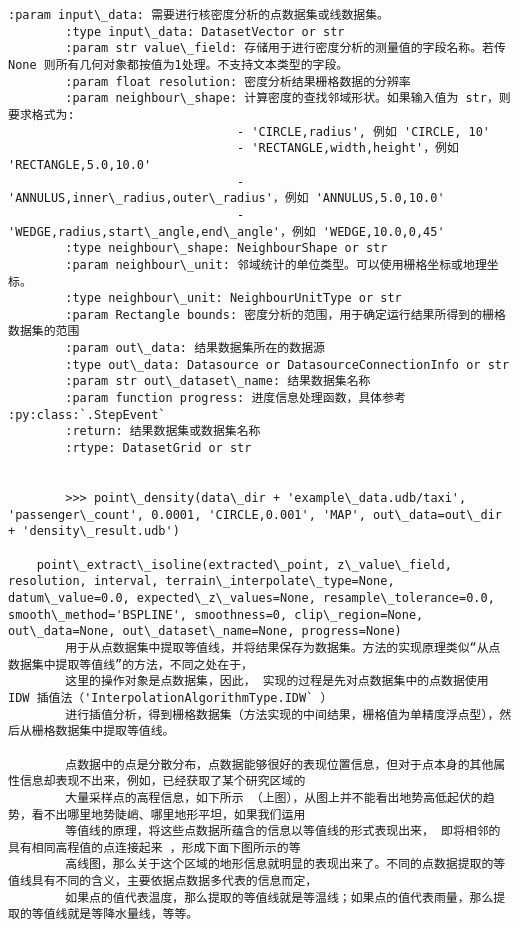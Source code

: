 \documentclass[11pt]{article}
\begin{document}
\begin{Verbatim}[commandchars=\\\{\}]
        :param input\_data: 需要进行核密度分析的点数据集或线数据集。
        :type input\_data: DatasetVector or str
        :param str value\_field: 存储用于进行密度分析的测量值的字段名称。若传 None 则所有几何对象都按值为1处理。不支持文本类型的字段。
        :param float resolution: 密度分析结果栅格数据的分辨率
        :param neighbour\_shape: 计算密度的查找邻域形状。如果输入值为 str，则要求格式为:
                                - 'CIRCLE,radius', 例如 'CIRCLE, 10'
                                - 'RECTANGLE,width,height'，例如 'RECTANGLE,5.0,10.0'
                                - 'ANNULUS,inner\_radius,outer\_radius'，例如 'ANNULUS,5.0,10.0'
                                - 'WEDGE,radius,start\_angle,end\_angle'，例如 'WEDGE,10.0,0,45'
        :type neighbour\_shape: NeighbourShape or str
        :param neighbour\_unit: 邻域统计的单位类型。可以使用栅格坐标或地理坐标。
        :type neighbour\_unit: NeighbourUnitType or str
        :param Rectangle bounds: 密度分析的范围，用于确定运行结果所得到的栅格数据集的范围
        :param out\_data: 结果数据集所在的数据源
        :type out\_data: Datasource or DatasourceConnectionInfo or str
        :param str out\_dataset\_name: 结果数据集名称
        :param function progress: 进度信息处理函数，具体参考 :py:class:`.StepEvent`
        :return: 结果数据集或数据集名称
        :rtype: DatasetGrid or str
        
        
        >>> point\_density(data\_dir + 'example\_data.udb/taxi', 'passenger\_count', 0.0001, 'CIRCLE,0.001', 'MAP', out\_data=out\_dir + 'density\_result.udb')
    
    point\_extract\_isoline(extracted\_point, z\_value\_field, resolution, interval, terrain\_interpolate\_type=None, datum\_value=0.0, expected\_z\_values=None, resample\_tolerance=0.0, smooth\_method='BSPLINE', smoothness=0, clip\_region=None, out\_data=None, out\_dataset\_name=None, progress=None)
        用于从点数据集中提取等值线，并将结果保存为数据集。方法的实现原理类似“从点数据集中提取等值线”的方法，不同之处在于，
        这里的操作对象是点数据集，因此， 实现的过程是先对点数据集中的点数据使用 IDW 插值法（'InterpolationAlgorithmType.IDW` ）
        进行插值分析，得到栅格数据集（方法实现的中间结果，栅格值为单精度浮点型），然后从栅格数据集中提取等值线。
        
        点数据中的点是分散分布，点数据能够很好的表现位置信息，但对于点本身的其他属性信息却表现不出来，例如，已经获取了某个研究区域的
        大量采样点的高程信息，如下所示 （上图），从图上并不能看出地势高低起伏的趋势，看不出哪里地势陡峭、哪里地形平坦，如果我们运用
        等值线的原理，将这些点数据所蕴含的信息以等值线的形式表现出来， 即将相邻的具有相同高程值的点连接起来 ，形成下面下图所示的等
        高线图，那么关于这个区域的地形信息就明显的表现出来了。不同的点数据提取的等值线具有不同的含义，主要依据点数据多代表的信息而定，
        如果点的值代表温度，那么提取的等值线就是等温线；如果点的值代表雨量，那么提取的等值线就是等降水量线，等等。
        

\end{Verbatim}
\end{document}
